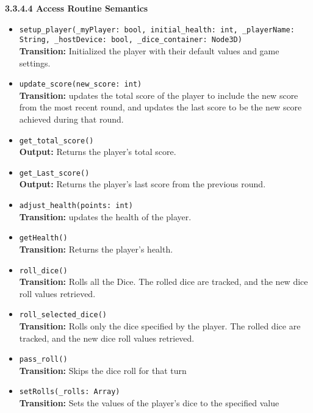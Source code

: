 \documentclass[12pt, titlepage]{article}
\begin{document}
\textbf{3.3.4.4 Access Routine Semantics}
\begin{itemize}

	\item \texttt{setup\_player(\_myPlayer: bool, initial\_health: int, \_playerName: String, \_hostDevice: bool, \_dice\_container: Node3D)}\\
	 \textbf{Transition:} Initialized the player with their default values and game settings.
	
    \item \texttt{update\_score(new\_score: int)}\\
    	\textbf{Transition:} updates the total score of the player to include the new score from the most recent round, and updates the last score to be the new score achieved during that round.
    
    \item \texttt{get\_total\_score()}\\
    \textbf{Output:} Returns the player's total score.
        	
    \item \texttt{get\_Last\_score()}\\
    \textbf{Output:} Returns the player's last score from the previous round.
    
    \item \texttt{adjust\_health(points: int)}\\
    \textbf{Transition:} updates the health of the player.
    
    \item \texttt{getHealth()}\\
    \textbf{Transition:} Returns the player's health.
    
    \item \texttt{roll\_dice()}\\
    \textbf{Transition:} Rolls all the Dice. The rolled dice are tracked, and the new dice roll values retrieved.
    
    \item \texttt{roll\_selected\_dice()}\\
    \textbf{Transition:} Rolls only the dice specified by the player. The rolled dice are tracked, and the new dice roll values retrieved.
    
    \item \texttt{pass\_roll()}\\
    \textbf{Transition:} Skips the dice roll for that turn
    
    \item \texttt{setRolls(\_rolls: Array)}\\
	\textbf{Transition:} Sets the values of the player's dice to the specified value
    

\end{itemize}
\end{document}
